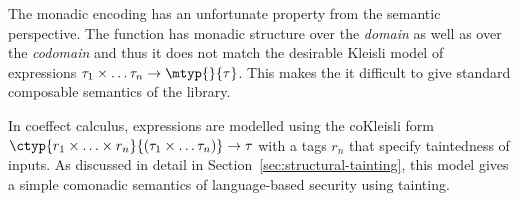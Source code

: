 The monadic encoding has an unfortunate property from the semantic perspective. 
The function has monadic structure over the \emph{domain} as well as over the \emph{codomain}
and thus it does not match the desirable Kleisli model of expressions $\tau_1 \times \ldots \tau_n \rightarrow \mtyp{}{\tau}$. 
This makes the it difficult to give standard composable semantics of the library.

In coeffect calculus, expressions are modelled using the coKleisli form 
$\ctyp{r_1 \times \ldots \times r_n}{(\tau_1 \times \ldots \tau_n)} \rightarrow \tau$ with a tags 
$r_n$ that specify taintedness of inputs. As discussed in detail in Section~\ref{sec:structural-tainting}, 
this model gives a simple comonadic semantics of language-based security using  tainting.



